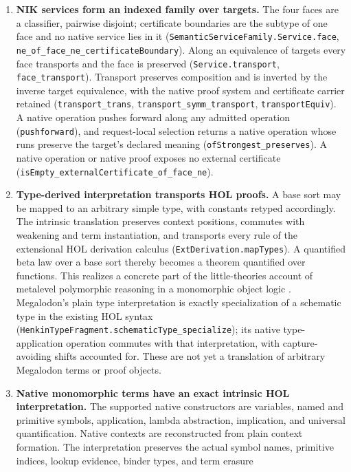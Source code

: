 \documentclass[11pt]{article}
\theoremstyle{definition}
\theoremstyle{remark}
\begin{document}
\begin{enumerate}
\item \textbf{NIK services form an indexed family over targets.} The
  four faces are a classifier, pairwise disjoint; certificate boundaries are
  the subtype of one face and no native service lies in it
  (\nolinkurl{SemanticServiceFamily.Service.face},
  \nolinkurl{ne_of_face_ne_certificateBoundary}).  Along an equivalence of
  targets every face transports and the face is preserved
  (\texttt{Service.transport}, \texttt{face\_transport}). Transport preserves
  composition and is inverted by the inverse target equivalence, with the
  native proof system and certificate carrier retained
  (\texttt{transport\_trans}, \nolinkurl{transport_symm_transport},
  \texttt{transportEquiv}). A native operation
  pushes forward along any admitted operation (\texttt{pushforward}), and
  request-local selection returns a native operation whose runs preserve the
  target's declared meaning (\nolinkurl{ofStrongest_preserves}).  A native
  operation or native proof exposes no external certificate
  (\nolinkurl{isEmpty_externalCertificate_of_face_ne}).
\item \textbf{Type-derived interpretation transports HOL proofs.}
  A base sort may be mapped to an arbitrary simple type, with constants
  retyped accordingly. The intrinsic translation preserves context positions,
  commutes with weakening and term instantiation, and transports every rule
  of the extensional HOL derivation calculus
  (\nolinkurl{ExtDerivation.mapTypes}). A quantified beta law over a base
  sort thereby becomes a theorem quantified over functions. This realizes
  a concrete part of the little-theories account of metalevel polymorphic
  reasoning in a monomorphic object logic \cite{FarmerLittleTheories2023}.
  Megalodon's plain type interpretation is exactly specialization of a
  schematic type in the existing HOL syntax
  (\nolinkurl{HenkinTypeFragment.schematicType_specialize}); its native
  type-application operation commutes with that interpretation, with
  capture-avoiding shifts accounted for. These are not yet a translation
  of arbitrary Megalodon terms or proof objects.
\item \textbf{Native monomorphic terms have an exact intrinsic HOL
  interpretation.} The supported native constructors are variables, named
  and primitive symbols, application, lambda abstraction, implication, and
  universal quantification. Native contexts are reconstructed from plain
  context formation. The interpretation preserves the actual symbol names,
  primitive indices, lookup evidence, binder types, and term erasure

\end{enumerate}
\end{document}
